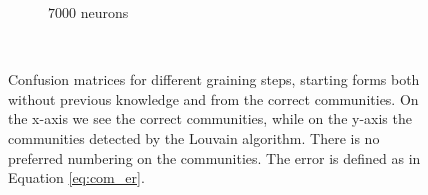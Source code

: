 \begin{figure}
\begin{subfigure}[b]{0.49\textwidth}
		\caption{$7000$ neurons}
	\end{subfigure}
	\\ \vspace{5mm}
	\caption{Confusion matrices for different graining steps, starting forms
	both without previous knowledge and from the correct communities. On the x-axis
		we see the correct communities, while on the y-axis the communities detected
		by the Louvain algorithm. There is no preferred numbering on the communities.
		The error is defined as in Equation \ref{eq:com_er}.}
	\label{fig:cmaps}
\end{figure}